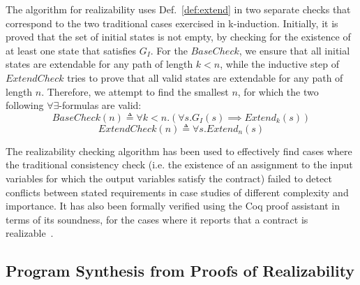 The algorithm for realizability uses Def.~\ref{def:extend} in two
separate checks that correspond to the two traditional cases exercised
in k-induction. Initially, it is proved that the set of initial states is
not empty, by checking for the existence of at least one
state that satisfies $G_I$. For the $\mathit{BaseCheck}$, we ensure
that all initial states are extendable for any path of length $k < n$,
while the inductive step of $\mathit{ExtendCheck}$ tries to prove that
all valid states are extendable for any path of length $n$. Therefore,
we attempt to find the smallest $n$, for which the two following
$\forall\exists$-formulas are valid:%
%
\begin{equation}
\label{eq:sbcheck}
\mathit{BaseCheck}(n) \triangleq \forall k < n. (\forall s. G_I(s)
	  	\implies \mathit{Extend}_k(s))
\end{equation}%
%
\begin{equation}
\label{eq:echeck}
\mathit{ExtendCheck}(n) \triangleq \forall s. \mathit{Extend}_n(s)
\end{equation}

The realizability checking algorithm has been used to effectively find cases
where the traditional consistency check (i.e. the existence of an assignment
to the input variables for which the output variables satisfy the contract)
failed to detect conflicts between stated requirements in case studies of
different complexity and importance. It has also been formally verified using the Coq proof assistant in terms of its
soundness, for the cases where it reports that a contract is
realizable~\cite{katis2015machine}.

\subsection{Program Synthesis from Proofs of Realizability}
\label{sec:realizability-synthesis}

